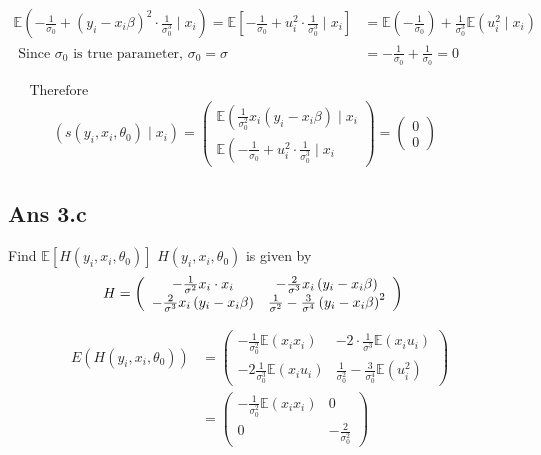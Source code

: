 \documentclass{article}
\begin{document}
$$
\begin{aligned}
\mathbb{E}\left(-\frac{1}{\sigma_0}+\left(y_i-x_i \beta\right)^2 \cdot \frac{1}{\sigma_0^3} \mid x_i\right)=\mathbb{E}\left[-\frac{1}{\sigma_0}+u_i^2 \cdot \frac{1}{\sigma_0^3} \mid x_i\right] & =\mathbb{E}\left(-\frac{1}{\sigma_0}\right)+\frac{1}{\sigma_0^3} \mathbb{E}\left(u_i^2 \mid x_i\right) \\
\text { Since } \sigma_0 \text { is true parameter, } \sigma_0=\sigma \quad & =-\frac{1}{\sigma_0}+\frac{1}{\sigma_0}=0
\end{aligned}
$$

$\begin{aligned} & \text { Therefore } \\ & \qquad\left(s\left(y_i, x_i, \theta_0\right) \mid x_i\right)=\left(\begin{array}{l}\mathbb{E}\left(\frac{1}{\sigma_0^2} x_i\left(y_i-x_i \beta\right) \mid x_i\right. \\ \mathbb{E}\left(-\frac{1}{\sigma_0}+u_i^2 \cdot \frac{1}{\sigma_0^3} \mid x_i\right.\end{array}\right)=\left(\begin{array}{l}0 \\ 0\end{array}\right)\end{aligned}$

\subsection*{Ans 3.c }
Find $\mathbb{E}\left[H\left(y_i, x_i, \theta_0\right)\right]$
$H\left(y_i, x_i, \theta_0 \right)$ is given by
$$
\begin{aligned}
H & =\left(\begin{array}{cc}
-\frac{1}{\sigma^2} x_i \cdot x_i & -\frac{2}{\sigma^3} x_i\left(y_i-x_i \beta\right) \\
-\frac{2}{\sigma^3} x_i\left(y_i-x_i \beta\right) & \frac{1}{\sigma^2}-\frac{3}{\sigma^4}\left(y_i-x_i \beta\right)^2
\end{array}\right)
\end{aligned}\\
$$

$$
\begin{aligned}
E\left(H\left(y_i, x_i, \theta_0\right)\right) & =\left(\begin{array}{cc}
-\frac{1}{\sigma_0^2} \mathbb{E}\left(x_i x_i\right) & -2 \cdot \frac{1}{\sigma^3} \mathbb{E}\left(x_i u_i\right) \\
-2 \frac{1}{\sigma_0^3} \mathbb{E}\left(x_i u_i\right) & \frac{1}{\sigma_0^2}-\frac{3}{\sigma_0^4} \mathbb{E}\left(u_i^2\right)
\end{array}\right) \\
& =\left(\begin{array}{cc}
-\frac{1}{\sigma_0^2} \mathbb{E}\left(x_i x_i\right) & 0 \\
0 & -\frac{2}{\sigma_0^2}
\end{array}\right)
\end{aligned}
$$
\end{document}
